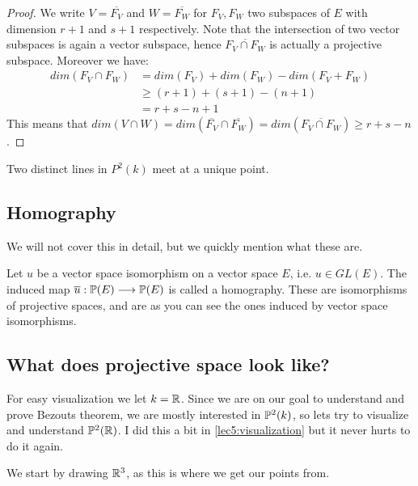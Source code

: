 \begin{proof}
We write $V=\overline{F_V}$ and $W=\overline{F_W}$ for $F_V, F_W$ two subspaces of $E$ with dimension $r+1$ and $s+1$ respectively. Note that the intersection of two vector subspaces is again a vector subspace, hence $\overline{F_V\cap F_W}$ is actually a projective subspace. Moreover we have:
\begin{align*}
    dim(F_V\cap F_W) &= dim (F_V) + dim (F_W) - dim(F_V+F_W) \\
    &\geq (r+1)+(s+1)-(n+1) \\
    &= r+s-n+1
\end{align*}
This means that $dim(V\cap W) = dim(\overline{F_V}\cap \overline{F_W})=dim(\overline{F_V\cap F_W})\geq r+s-n$.
\end{proof}

\begin{example}
     Two distinct lines in $P^2(k)$ meet at a unique point. 
\end{example}



\subsection{Homography}

We will not cover this in detail, but we quickly mention what these are. 

\begin{definition}[Homography]
Let $u$ be a vector space isomorphism on a vector space $E$, i.e. $u\in GL(E)$. The induced map $\overline{u}:\P(E)\longrightarrow \P(E)$ is called a homography. These are isomorphisms of projective spaces, and are as you can see the ones induced by vector space isomorphisms. 
\end{definition}


\subsection{What does projective space look like?}

For easy visualization we let $k=\R$. Since we are on our goal to understand and prove Bezouts theorem, we are mostly interested in $\P^2(k)$, so lets try to visualize and understand $\P^2(\R)$. I did this a bit in \ref{lec5:visualization} but it never hurts to do it again. 

We start by drawing $\R^3$, as this is where we get our points from. 
\begin{center}
\def\svgwidth{0.4\textwidth}

\end{center}

